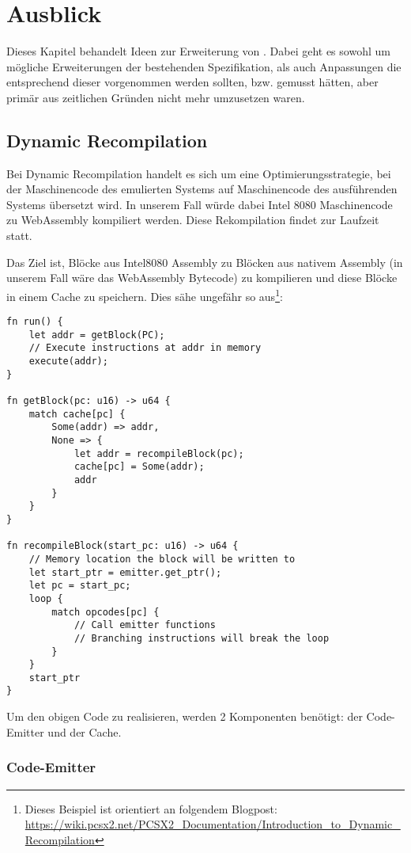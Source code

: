 \chapter{Ausblick}

Dieses Kapitel behandelt Ideen zur Erweiterung von \Emu. Dabei geht es sowohl um mögliche Erweiterungen der bestehenden Spezifikation, als auch Anpassungen die entsprechend dieser vorgenommen werden sollten, bzw. gemusst hätten, aber primär aus zeitlichen Gründen nicht mehr umzusetzen waren.

\section{Dynamic Recompilation}

Bei Dynamic Recompilation handelt es sich um eine Optimierungsstrategie, bei der Maschinencode des emulierten Systems auf Maschinencode des ausführenden Systems übersetzt wird. In unserem Fall würde dabei Intel 8080 Maschinencode zu WebAssembly kompiliert werden. Diese Rekompilation findet zur Laufzeit statt.

Das Ziel ist, Blöcke aus Intel8080 Assembly zu Blöcken aus nativem Assembly (in unserem Fall wäre das WebAssembly Bytecode) zu kompilieren und diese Blöcke in einem Cache zu speichern. Dies sähe ungefähr so aus\footnote{Dieses Beispiel ist orientiert an folgendem Blogpost: \url{https://wiki.pcsx2.net/PCSX2_Documentation/Introduction_to_Dynamic_Recompilation}}:


\begin{verbatim}
fn run() {
    let addr = getBlock(PC);
    // Execute instructions at addr in memory
    execute(addr);
}

fn getBlock(pc: u16) -> u64 {
    match cache[pc] {
        Some(addr) => addr,
        None => {
            let addr = recompileBlock(pc);
            cache[pc] = Some(addr);
            addr
        }
    }
}

fn recompileBlock(start_pc: u16) -> u64 {
    // Memory location the block will be written to
    let start_ptr = emitter.get_ptr();
    let pc = start_pc;
    loop {
        match opcodes[pc] {
            // Call emitter functions
            // Branching instructions will break the loop
        }
    }
    start_ptr
}
\end{verbatim}

Um den obigen Code zu realisieren, werden 2 Komponenten benötigt: der Code-Emitter und der Cache.

\subsection{Code-Emitter}

